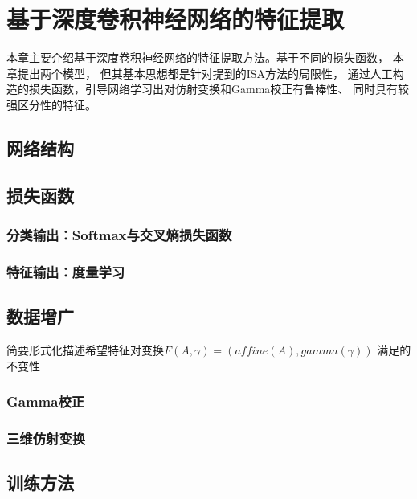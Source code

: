 
\chapter{基于深度卷积神经网络的特征提取}
本章主要介绍基于深度卷积神经网络的特征提取方法。基于不同的损失函数，
本章提出两个模型，
但其基本思想都是针对提到的ISA方法的局限性，
通过人工构造的损失函数，引导网络学习出对仿射变换和Gamma校正有鲁棒性、
同时具有较强区分性的特征。

\section{网络结构}

\section{损失函数}
\subsection{分类输出：Softmax与交叉熵损失函数}
\subsection{特征输出：度量学习}

\section{数据增广}
简要形式化描述希望特征对变换$F(A, \gamma)=(affine(A), gamma(\gamma))$
满足的不变性

\subsection{Gamma校正}

\subsection{三维仿射变换}

\section{训练方法}


